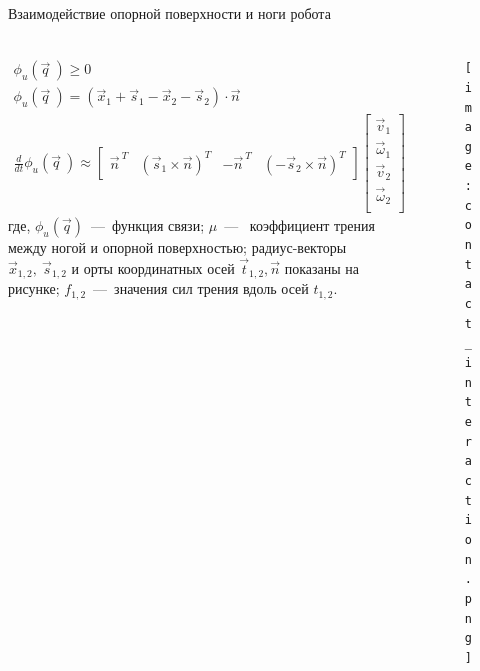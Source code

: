 \begin{frame}[t]{Взаимодействие опорной поверхности и ноги робота}
    \framesubtitle{}
    \begin{columns}[T,onlytextwidth]
        \begin{column}{0.64\textwidth}
            \begin{align}
                \phi_u(\vec{q}\ ) \geqslant 0                                                     \\
                \phi_u(\vec{q}\ ) = (\vec{x}_1 + \vec{s}_1 - \vec{x}_2 - \vec{s}_2) \cdot \vec{n} \\
                \frac{d }{d t}\phi_u(\vec{q}\ ) \approx \begin{bmatrix}
                                                            \vec{n}^{\ T} & (\vec{s}_1 \times \vec{n})^T & -\vec{n}^{\ T} & (-\vec{s}_2 \times \vec{n})^T
                                                        \end{bmatrix} \begin{bmatrix}
                                                                          \vec{v}_1      \\
                                                                          \vec{\omega}_1 \\
                                                                          \vec{v}_2      \\
                                                                          \vec{\omega}_2 \\
                                                                      \end{bmatrix}
            \end{align}
            где, $\phi_u(\vec{q})$~---~функция связи; $ \mu $~---~ коэффициент трения между ногой и опорной поверхностью;  радиус-векторы $\vec{x}_{1,2},\ \vec{s}_{1,2}$ и орты координатных осей $\vec{t}_{1,2}, \vec{n}$ показаны на рисунке; $ f_{1,2} $~---~значения сил трения вдоль осей $t_{1,2}$.
        \end{column}
        \begin{column}{0.35\textwidth}
            \vspace{-0.4cm}
            \begin{figure}[H]
                \centering\texttt{[image: contact\_interaction.png]}
            \end{figure}
            \vspace{-1cm}
            \begin{align}

\end{align}
\end{column}
\end{columns}
\end{frame}
